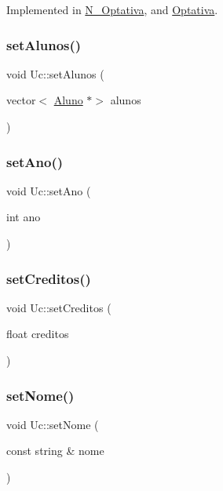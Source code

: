 Implemented in \hyperlink{class_n___optativa_aeb26db4a13ec5c11afa10b7e39bba66d}{N\+\_\+\+Optativa}, and \hyperlink{class_optativa_afcfc090c02bffe03c1316d1f00b0dca3}{Optativa}.

\hypertarget{class_uc_a1bddbeaf97c10e45e2587b1c378f8be6}{}\label{class_uc_a1bddbeaf97c10e45e2587b1c378f8be6} 
\subsubsection{\texorpdfstring{set\+Alunos()}{setAlunos()}}
{\footnotesize\ttfamily void Uc\+::set\+Alunos (\begin{DoxyParamCaption}\item[{vector$<$ \hyperlink{class_aluno}{Aluno} $\ast$$>$}]{alunos }\end{DoxyParamCaption})}

\hypertarget{class_uc_a4c6b722e1abbeab671c84d9b8fb4937b}{}\label{class_uc_a4c6b722e1abbeab671c84d9b8fb4937b} 
\subsubsection{\texorpdfstring{set\+Ano()}{setAno()}}
{\footnotesize\ttfamily void Uc\+::set\+Ano (\begin{DoxyParamCaption}\item[{int}]{ano }\end{DoxyParamCaption})}

\hypertarget{class_uc_a40f0de8ac22eac7b670d715cd242587f}{}\label{class_uc_a40f0de8ac22eac7b670d715cd242587f} 
\subsubsection{\texorpdfstring{set\+Creditos()}{setCreditos()}}
{\footnotesize\ttfamily void Uc\+::set\+Creditos (\begin{DoxyParamCaption}\item[{float}]{creditos }\end{DoxyParamCaption})}

\hypertarget{class_uc_a278e8288a1aa28daea1fc851348edc88}{}\label{class_uc_a278e8288a1aa28daea1fc851348edc88} 
\subsubsection{\texorpdfstring{set\+Nome()}{setNome()}}
{\footnotesize\ttfamily void Uc\+::set\+Nome (\begin{DoxyParamCaption}\item[{const string \&}]{nome }\end{DoxyParamCaption})}

